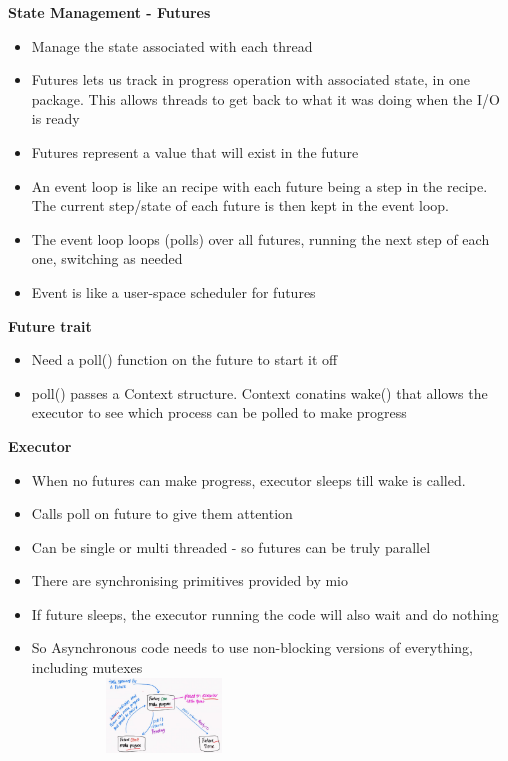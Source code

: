 \documentclass[10pt, landscape]{article}
\begin{document}
\begin{multicols}{4}
\textbf{State Management - Futures} \\
\begin{itemize}
    \item Manage the state associated with each thread
    \item Futures lets us track in progress operation with associated state, in one package. This allows threads to get back to what it was doing when the I/O is ready 
    \item Futures represent a value that will exist in the future
    \item An event loop is like an recipe with each future being a step in the recipe. The current step/state of each future is then kept in the event loop.
    \item The event loop loops (polls) over all futures, running the next step of each one, switching as needed
    \item Event is like a user-space scheduler for futures
\end{itemize}

\textbf{Future trait} \\
\begin{itemize}
    \item Need a poll() function on the future to start it off 
    \item poll() passes a Context structure. Context conatins wake() that allows the executor to see which process can be polled to make progress
\end{itemize}

\textbf{Executor} \\
\begin{itemize}
    \item When no futures can make progress, executor sleeps till wake is called.
    \item Calls poll on future to give them attention
    \item Can be single or multi threaded - so futures can be truly parallel
    \item There are synchronising primitives provided by mio 
    \item If future sleeps, the executor running the code will also wait and do nothing
    \item So Asynchronous code needs to use non-blocking versions of everything, including mutexes\\
    \includegraphics*[width=7cm, height=2cm]{executor.png}
\end{itemize}


\end{multicols}
\end{document}

